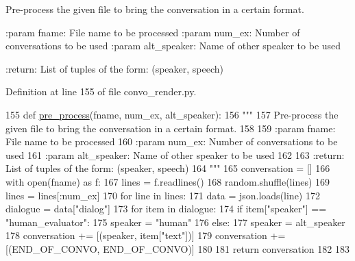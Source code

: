 \begin{DoxyVerb}Pre-process the given file to bring the conversation in a certain format.

:param fname: File name to be processed
:param num_ex: Number of conversations to be used
:param alt_speaker: Name of other speaker to be used

:return: List of tuples of the form: (speaker, speech)
\end{DoxyVerb}
 

Definition at line 155 of file convo\+\_\+render.\+py.


\begin{DoxyCode}
155 \textcolor{keyword}{def }\hyperlink{namespaceparlai_1_1scripts_1_1convo__render_a0f0a031443ca797c936d2961a702a45e}{pre\_process}(fname, num\_ex, alt\_speaker):
156     \textcolor{stringliteral}{"""}
157 \textcolor{stringliteral}{    Pre-process the given file to bring the conversation in a certain format.}
158 \textcolor{stringliteral}{}
159 \textcolor{stringliteral}{    :param fname: File name to be processed}
160 \textcolor{stringliteral}{    :param num\_ex: Number of conversations to be used}
161 \textcolor{stringliteral}{    :param alt\_speaker: Name of other speaker to be used}
162 \textcolor{stringliteral}{}
163 \textcolor{stringliteral}{    :return: List of tuples of the form: (speaker, speech)}
164 \textcolor{stringliteral}{    """}
165     conversation = []
166     with open(fname) \textcolor{keyword}{as} f:
167         lines = f.readlines()
168         random.shuffle(lines)
169         lines = lines[:num\_ex]
170         \textcolor{keywordflow}{for} line \textcolor{keywordflow}{in} lines:
171             data = json.loads(line)
172             dialogue = data[\textcolor{stringliteral}{"dialog"}]
173             \textcolor{keywordflow}{for} item \textcolor{keywordflow}{in} dialogue:
174                 \textcolor{keywordflow}{if} item[\textcolor{stringliteral}{"speaker"}] == \textcolor{stringliteral}{"human\_evaluator"}:
175                     speaker = \textcolor{stringliteral}{"human"}
176                 \textcolor{keywordflow}{else}:
177                     speaker = alt\_speaker
178                 conversation += [(speaker, item[\textcolor{stringliteral}{"text"}])]
179             conversation += [(END\_OF\_CONVO, END\_OF\_CONVO)]
180 
181     \textcolor{keywordflow}{return} conversation
182 
183 
\end{DoxyCode}
\mbox{\label{namespaceparlai_1_1scripts_1_1convo__render_a4078a037f4f5526297e7860fbed9cfb2}} 
